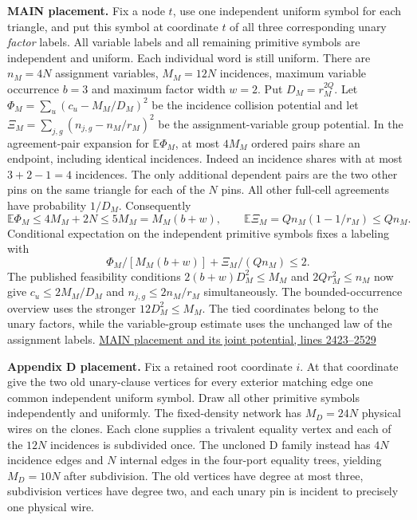 \documentclass[
  11pt,
]{article}
\begin{document}
\textbf{MAIN placement.} Fix a node \(t\), use one independent uniform
symbol for each triangle, and put this symbol at coordinate \(t\) of all
three corresponding unary \emph{factor} labels. All variable labels and
all remaining primitive symbols are independent and uniform. Each
individual word is still uniform. There are \(n_M=4N\) assignment
variables, \(M_M=12N\) incidences, maximum variable occurrence \(b=3\)
and maximum factor width \(w=2\). Put \(D_M=r_M^{2Q}\). Let
\(\Phi_M=\sum_u(c_u-M_M/D_M)^2\) be the incidence collision potential
and let \(\Xi_M=\sum_{j,g}(n_{j,g}-n_M/r_M)^2\) be the
assignment-variable group potential. In the agreement-pair expansion for
\(\mathbb E\Phi_M\), at most \(4M_M\) ordered pairs share an endpoint,
including identical incidences. Indeed an incidence shares with at most
\(3+2-1=4\) incidences. The only additional dependent pairs are the two
other pins on the same triangle for each of the \(N\) pins. All other
full-cell agreements have probability \(1/D_M\). Consequently \[
 \mathbb E\Phi_M\le4M_M+2N\le5M_M=M_M(b+w),
 \qquad \mathbb E\Xi_M=Qn_M(1-1/r_M)\le Qn_M.
\] Conditional expectation on the independent primitive symbols fixes a
labeling with \[
 \Phi_M/[M_M(b+w)]+\Xi_M/(Qn_M)\le2 .
\] The published feasibility conditions \(2(b+w)D_M^2\le M_M\) and
\(2Qr_M^2\le n_M\) now give \(c_u\le2M_M/D_M\) and
\(n_{j,g}\le2n_M/r_M\) simultaneously. The bounded-occurrence overview
uses the stronger \(12D_M^2\le M_M\). The tied coordinates belong to the
unary factors, while the variable-group estimate uses the unchanged law
of the assignment labels.
\href{https://github.com/openai/math/blob/main/preprints/The-Exponential-Time-Hypothesis-is-False-October-25-2026/build/main_full_version.tex\#L2423-L2529}{MAIN
placement and its joint potential, lines 2423--2529}

\textbf{Appendix D placement.} Fix a retained root coordinate \(i\). At
that coordinate give the two old unary-clause vertices for every
exterior matching edge one common independent uniform symbol. Draw all
other primitive symbols independently and uniformly. The fixed-density
network has \(M_D=24N\) physical wires on the clones. Each clone
supplies a trivalent equality vertex and each of the \(12N\) incidences
is subdivided once. The uncloned D family instead has \(4N\) incidence
edges and \(N\) internal edges in the four-port equality trees, yielding
\(M_D=10N\) after subdivision. The old vertices have degree at most
three, subdivision vertices have degree two, and each unary pin is
incident to precisely one physical wire.
\end{document}

